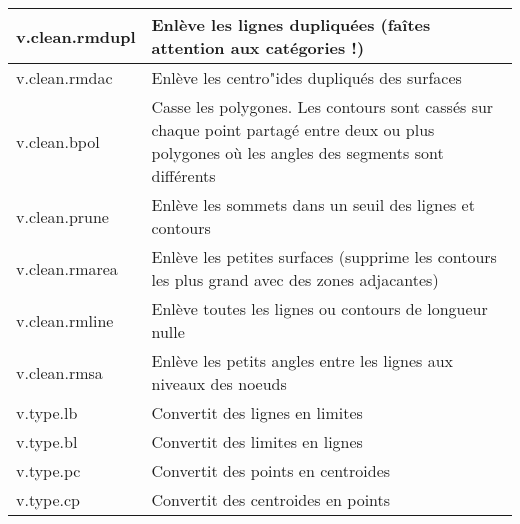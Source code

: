 \begin{table}[H]
{\begin{longtable}{|p{2.5cm}|p{11.5cm}|}
  \hline v.clean.rmdupl & Enlève les lignes dupliquées  (faîtes attention aux catégories !) \\
  \hline v.clean.rmdac & Enlève les centro"ides dupliqués des surfaces\\
  \hline v.clean.bpol & Casse les polygones. Les contours sont cassés sur chaque point partagé entre deux ou plus polygones où les angles des segments sont différents\\
  \hline v.clean.prune & Enlève les sommets dans un seuil des lignes et contours\\
  \hline v.clean.rmarea & Enlève les petites surfaces (supprime les contours les plus grand avec des zones adjacantes) \\
  \hline v.clean.rmline & Enlève toutes les lignes ou contours de longueur nulle\\
  \hline v.clean.rmsa & Enlève les petits angles entre les lignes aux niveaux des noeuds\\
  \hline v.type.lb & Convertit des lignes en limites\\
  \hline v.type.bl & Convertit des limites en lignes\\
  \hline v.type.pc & Convertit des points en centroides \\
  \hline v.type.cp & Convertit des centroides en points \\

\end{longtable}}
\end{table}
